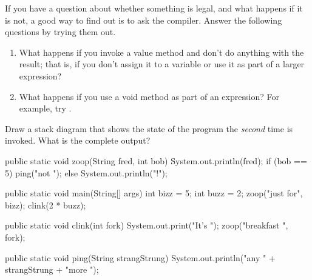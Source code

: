 \begin{exercise}  %

If you have a question about whether something is legal, and what happens if it is not, a good way to find out is to ask the compiler.
Answer the following questions by trying them out.

\begin{enumerate}

\item What happens if you invoke a value method and don't do anything with the result; that is, if you don't assign it to a variable or use it as part of a larger expression?

\item What happens if you use a void method as part of an expression?
For example, try .

\end{enumerate}

\end{exercise}


\begin{exercise}  %

Draw a stack diagram that shows the state of the program the {\em second} time  is invoked.
What is the complete output?

\begin{code}
public static void zoop(String fred, int bob) {
    System.out.println(fred);
    if (bob == 5) {
        ping("not ");
    } else {
        System.out.println("!");
    }
}
\end{code}

\begin{code}
public static void main(String[] args) {
    int bizz = 5;
    int buzz = 2;
    zoop("just for", bizz);
    clink(2 * buzz);
}
\end{code}

\begin{code}
public static void clink(int fork) {
    System.out.print("It's ");
    zoop("breakfast ", fork);
}
\end{code}

\begin{code}
public static void ping(String strangStrung) {
    System.out.println("any " + strangStrung + "more ");
}
\end{code}

\end{exercise}



